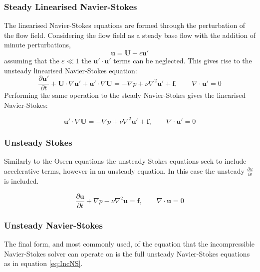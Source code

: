 \documentclass[11pt, a4paper]{report}
\begin{document}
\subsubsection{Steady Linearised Navier-Stokes}
The linearised Navier-Stokes equations are formed through the perturbation of the flow field. Considering the flow field as a steady base flow with the addition of minute perturbations,
\begin{equation}
\mathbf{u} = \mathbf{U} + \epsilon\mathbf{u'}
\end{equation}
assuming that the $\varepsilon \ll 1$ the $\mathbf{u'} \cdot \mathbf{u'}$ terms can be neglected. This gives rise to the unsteady linearised Navier-Stokes equation:
\begin{equation}
\frac{\partial \mathbf{u'}}{\partial t} + \mathbf{U} \cdot \nabla \mathbf{u'} + \mathbf{u'} \cdot \nabla \mathbf{U} = - \nabla p + \nu  \nabla^{2} \mathbf{u'} + \mathbf{f}, \qquad \nabla\cdot\mathbf{u'} = 0
\label{eq:UnsteadyLinearisedNS}
\end{equation}
Performing the same operation to the steady Navier-Stokes gives the linearised Navier-Stokes:

\begin{equation}
\mathbf{u'} \cdot \nabla \mathbf{U} = - \nabla p + \nu  \nabla^{2} \mathbf{u'} + \mathbf{f}, \qquad \nabla\cdot\mathbf{u'} = 0
\label{eq:SteadyLinearisedNS}
\end{equation}

\subsubsection{Unsteady Stokes}
Similarly to the Oseen equations the unsteady Stokes equations seek to include accelerative terms, however in an unsteady equation. In this case the unsteady $\frac{\partial u}{\partial t}$ is included.

\begin{equation}
\frac{\partial \mathbf{u}}{\partial t} + \nabla p - \nu \nabla^{2} \mathbf{u} = \mathbf{f}, \qquad \nabla \cdot \mathbf{u} = 0
\label{eq:UnsteadyStokes}
\end{equation}

\subsubsection{Unsteady Navier-Stokes}
The final form, and most commonly used, of the equation that the incompressible Navier-Stokes solver can operate on is the full unsteady Navier-Stokes equations as in equation \ref{eq:IncNS}.
		
\end{document}
